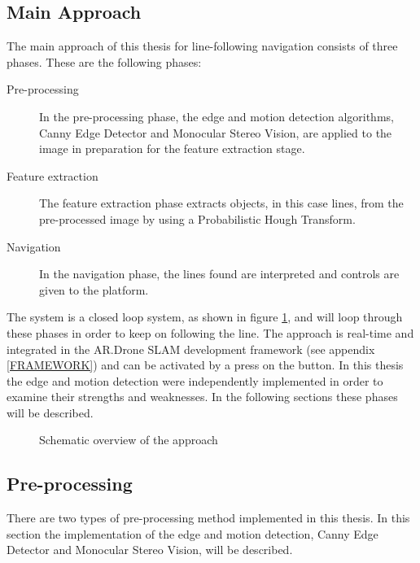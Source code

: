 \documentclass[a4paper]{article}
\begin{document}
\subsection{Main Approach}
The main approach of this thesis for line-following navigation consists of three phases. These are the following phases:
\begin{description}
\item[Pre-processing] In the pre-processing phase, the edge and motion detection algorithms, Canny Edge Detector and Monocular Stereo Vision, are applied to the image in preparation for the feature extraction stage.
\item[Feature extraction] The feature extraction phase extracts objects, in this case lines, from the pre-processed image by using a Probabilistic Hough Transform.
\item[Navigation] In the navigation phase, the lines found are interpreted and controls are given to the platform.
\end{description}
The system is a closed loop system, as shown in figure \ref{system_overview}, and will loop through these phases in order to keep on following the line. The approach is real-time and integrated in the AR.Drone SLAM \cite{Dijkshoorn2012} development framework (see appendix \ref{FRAMEWORK}) and can be activated by a press on the button. In this thesis the edge and motion detection were independently implemented in order to examine their strengths and weaknesses. In the following sections these phases will be described.

\begin{figure}[!ht]
\centerline{
}
\caption{Schematic overview of the approach}
\label{system_overview}
\end{figure}

\subsection{Pre-processing}
There are two types of pre-processing method implemented in this thesis. In this section the implementation of the edge and motion detection, Canny Edge Detector and Monocular Stereo Vision, will be described.
\end{document}
